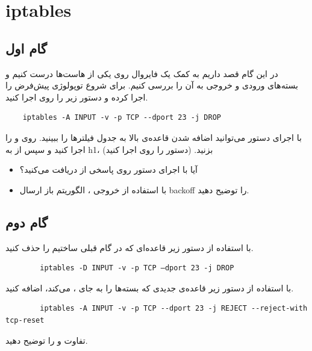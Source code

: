 \documentclass[10pt,a4paper]{article}
\numberwithin{equation}{section}
\numberwithin{figure}{section}
\numberwithin{table}{section}
\begin{document}
\section{iptables}

\begin{otherlanguage}{farsi}
    \subsection{گام اول}
در این گام قصد داریم به کمک  یک فایروال روی یکی از هاست‌ها درست کنيم و بسته‌های ورودی و خروجی به آن را بررسی کنيم. برای شروع توپولوژی پيش‌فرض  را اجرا کرده و دستور زیر را روی   اجرا کنيد.
\end{otherlanguage}
\begin{verbatim}
    iptables -A INPUT -v -p TCP --dport 23 -j DROP
\end{verbatim}
\begin{otherlanguage}{farsi}
با اجرای دستور  می‌توانيد اضافه شدن قاعده‌ی بالا به جدول فيلترها را ببينيد. روی  و   را اجرا کنيد و سپس از  به {h1}،  بزنيد.  (دستور  را روی  اجرا کنيد)
\begin{itemize}
    \item آیا با اجرای دستور  روی  پاسخی از  دریافت می‌کنيد؟
    \item با استفاده از خروجی‌ ، الگوريتم باز ارسال  backoff را توضيح دهيد.
\end{itemize}


\subsection{گام دوم}
با استفاده از دستور زیر قاعده‌ای که در گام قبلی ساختيم را حذف کنيد.

\begin{otherlanguage}{english}
    \begin{verbatim}
        iptables -D INPUT -v -p TCP –dport 23 -j DROP
    \end{verbatim}
\end{otherlanguage}
با استفاده از دستور زیر قاعده‌ی جدیدی که بسته‌ها را به جای ،  می‌کند، اضافه کنيد.
\begin{otherlanguage}{english}
    \begin{verbatim}
        iptables -A INPUT -v -p TCP --dport 23 -j REJECT --reject-with tcp-reset
    \end{verbatim}
\end{otherlanguage}
تفاوت  و  را توضيح دهيد.
\end{otherlanguage}
\end{document}
